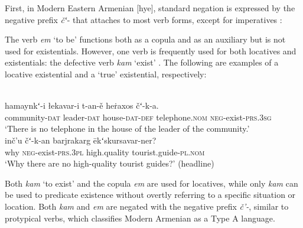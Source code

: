 \documentclass[output=paper]{langsci/langscibook}
\begin{document}
First, in Modern Eastern Armenian [hye], standard negation is
expressed by the negative prefix \textit{čʻ}- that attaches to most verb
forms, except for imperatives \parencite[522]{DumTragut2009}:
%
    \begin{exe}\end{exe}
%
The verb \textit{em} `to be' functions both as a copula and as an auxiliary
\parencite[215]{DumTragut2009} but is not used for existentials. However,
one verb is frequently used for both locatives and existentials: the
defective verb \textit{kam} `exist' \parencite[282]{DumTragut2009}. The following are examples of a locative existential and a `true' existential, respectively:
%
\begin{exe}
\ex
{}\\
    \gll hamaynkʻ-i łekavar-i t-an-ě heṙaxos čʻ-k-a.  \\
community-\textsc{dat} leader-\textsc{dat} house-\textsc{dat-def}
telephone.\textsc{nom} \textsc{neg}-exist-\textsc{prs.3sg} \\
\glt `There is no telephone in the house of the leader of the community.' 
\ex
{}\\
    \gll inč’u čʻ-k-an barjrakarg ēkʻskursavar-ner?  \\
why \textsc{neg}-exist-\textsc{prs.3pl} high.quality
tourist.guide-\textsc{pl.nom} \\
    \glt `Why there are no high-quality tourist guides?' (headline)
    \end{exe}
%
Both \textit{kam} `to exist' and the copula \textit{em} are used for locatives, while only \textit{kam} can be used to predicate existence without overtly referring to a specific situation or location. Both \textit{kam} and \textit{em} are negated with the negative prefix \textit{č’-}, similar to protypical verbs, which classifies Modern Armenian as a Type A language. 
\end{document}

